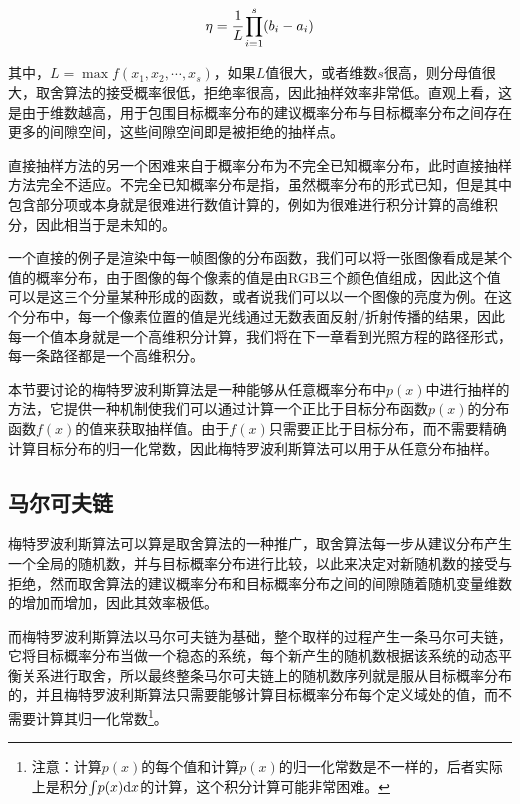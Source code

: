 \begin{equation}
	\eta= \cfrac{1}{L}\prod^{s}_{i=1}(b_i-a_i)
\end{equation}

\noindent 其中，$L=\max{f(x_1,x_2,\cdots,x_s)}$，如果$L$值很大，或者维数$s$很高，则分母值很大，取舍算法的接受概率很低，拒绝率很高，因此抽样效率非常低。直观上看，这是由于维数越高，用于包围目标概率分布的建议概率分布与目标概率分布之间存在更多的间隙空间，这些间隙空间即是被拒绝的抽样点。

直接抽样方法的另一个困难来自于概率分布为不完全已知概率分布，此时直接抽样方法完全不适应。不完全已知概率分布是指，虽然概率分布的形式已知，但是其中包含部分项或本身就是很难进行数值计算的，例如为很难进行积分计算的高维积分，因此相当于是未知的。

一个直接的例子是渲染中每一帧图像的分布函数，我们可以将一张图像看成是某个值的概率分布，由于图像的每个像素的值是由RGB三个颜色值组成，因此这个值可以是这三个分量某种形成的函数，或者说我们可以以一个图像的亮度为例。在这个分布中，每一个像素位置的值是光线通过无数表面反射/折射传播的结果，因此每一个值本身就是一个高维积分计算，我们将在下一章看到光照方程的路径形式，每一条路径都是一个高维积分。

本节要讨论的梅特罗波利斯算法是一种能够从任意概率分布中$p(x)$中进行抽样的方法，它提供一种机制使我们可以通过计算一个正比于目标分布函数$p(x)$的分布函数$f(x)$的值来获取抽样值。由于$f(x)$只需要正比于目标分布，而不需要精确计算目标分布的归一化常数，因此梅特罗波利斯算法可以用于从任意分布抽样。





\subsection{马尔可夫链}
梅特罗波利斯算法可以算是取舍算法的一种推广，取舍算法每一步从建议分布产生一个全局的随机数，并与目标概率分布进行比较，以此来决定对新随机数的接受与拒绝，然而取舍算法的建议概率分布和目标概率分布之间的间隙随着随机变量维数的增加而增加，因此其效率极低。

而梅特罗波利斯算法以马尔可夫链为基础，整个取样的过程产生一条马尔可夫链，它将目标概率分布当做一个稳态的系统，每个新产生的随机数根据该系统的动态平衡关系进行取舍，所以最终整条马尔可夫链上的随机数序列就是服从目标概率分布的，并且梅特罗波利斯算法只需要能够计算目标概率分布每个定义域处的值，而不需要计算其归一化常数\footnote{注意：计算$p(x)$的每个值和计算$p(x)$的归一化常数是不一样的，后者实际上是积分${\rm \int} p(x){\rm d}x$的计算，这个积分计算可能非常困难。}。


